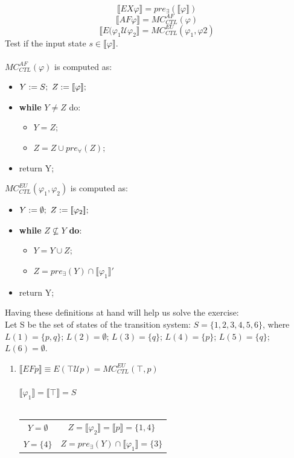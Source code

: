 \documentclass[10pt,a4paper]{article}
\begin{document}
\[ \llbracket EX\varphi \rrbracket = pre_\exists( \llbracket \varphi \rrbracket ) \]
\[ \llbracket AF\varphi \rrbracket = MC^{AF}_{CTL}(\varphi) \]
\[ \llbracket E(\varphi_1 \mathcal{U} \varphi_2 \rrbracket = MC^{EU}_{CTL}(\varphi_1, \varphi2) \]
Test if the input state $s \in \llbracket \varphi \rrbracket$.\\\\
$MC^{AF}_{CTL}(\varphi)$ is computed as:
\begin{itemize}
\item $Y:=S; \textsl{ } Z:= \llbracket \varphi \rrbracket;$
\item \textbf{while} $Y \neq Z$ do:
	\begin{itemize}
	\item $Y = Z;$
	\item $Z = Z \cup pre_\forall(Z);$ 
	\end{itemize}
\item return Y;
\end{itemize}
$MC^{EU}_{CTL}(\varphi_1, \varphi_2)$ is computed as: 
\begin{itemize}
\item $Y:=\emptyset; \textsl{ } Z:= \llbracket \varphi_2 \rrbracket;$
\item \textbf{while} $Z \not \subseteq Y$ \textbf{do}:
	\begin{itemize}
	\item $Y = Y \cup Z;$
	\item $Z = pre_\exists(Y) \cap \llbracket \varphi_1 \rrbracket'$
	\end{itemize}
\item return Y;
\end{itemize}
Having these definitions at hand will help us solve the exercise:\\
Let S be the set of states of the transition system: $S = \{1, 2, 3, 4, 5, 6\}$, where\\
$L(1) = \{ p, q \}$; $L(2) = \emptyset$; $L(3) = \{ q \}$; $L(4) = \{ p \}$; $L(5) = \{ q \}$; $L(6) = \emptyset$.

\begin{enumerate}
\item $\llbracket EFp \rrbracket \equiv E(\top\mathcal{U}p) = MC^{EU}_{CTL}(\top, p)$\\\\
$\llbracket \varphi_1 \rrbracket = \llbracket \top \rrbracket = S$\\\\
\begin{tabular}{c c}
$Y = \emptyset$ & $Z = \llbracket \varphi_2 \rrbracket = \llbracket p \rrbracket = \{ 1, 4 \}$\\
$Y = \{ 4 \}$ & $Z = pre_\exists(Y) \cap \llbracket \varphi_1 \rrbracket = \{ 3 \}$

\end{tabular}
\end{enumerate}
\end{document}
